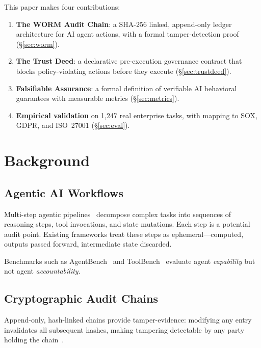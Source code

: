 \documentclass[12pt,letterpaper]{article}
\begin{document}
This paper makes four contributions:
\begin{enumerate}
  \item \textbf{The WORM Audit Chain}: a SHA-256 linked, append-only ledger
    architecture for AI agent actions, with a formal tamper-detection proof
    (\S\ref{sec:worm}).
  \item \textbf{The Trust Deed}: a declarative pre-execution governance
    contract that blocks policy-violating actions before they execute
    (\S\ref{sec:trustdeed}).
  \item \textbf{Falsifiable Assurance}: a formal definition of verifiable AI
    behavioral guarantees with measurable metrics (\S\ref{sec:metrics}).
  \item \textbf{Empirical validation} on 1{,}247 real enterprise tasks, with
    mapping to SOX, GDPR, and ISO~27001 (\S\ref{sec:eval}).
\end{enumerate}

\section{Background}
\label{sec:background}

\subsection{Agentic AI Workflows}

Multi-step agentic pipelines~\citep{yao2023react,schick2023toolformer,
chase2022langchain} decompose complex tasks into sequences of reasoning steps,
tool invocations, and state mutations. Each step is a potential audit point.
Existing frameworks treat these steps as ephemeral---computed, outputs passed
forward, intermediate state discarded.

Benchmarks such as AgentBench~\citep{liu2023agentbench} and
ToolBench~\citep{qin2023toolllm} evaluate agent \emph{capability} but not
agent \emph{accountability}.

\subsection{Cryptographic Audit Chains}

Append-only, hash-linked chains provide tamper-evidence: modifying any entry
invalidates all subsequent hashes, making tampering detectable by any party
holding the chain~\citep{nakamoto2008bitcoin,laurie2014certificatetransparency}.
\end{document}
